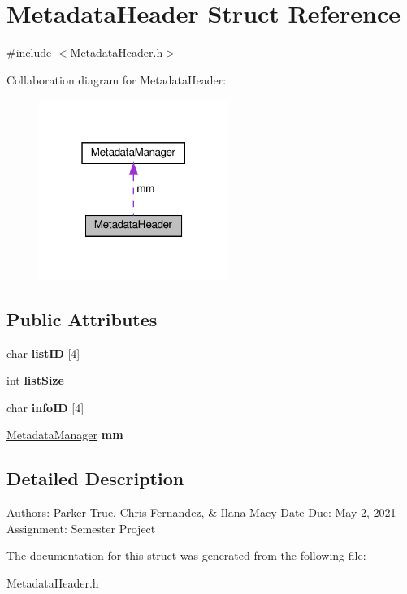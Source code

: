 \hypertarget{structMetadataHeader}{}\section{Metadata\+Header Struct Reference}
\label{structMetadataHeader}


{\ttfamily \#include $<$Metadata\+Header.\+h$>$}



Collaboration diagram for Metadata\+Header\+:
\nopagebreak
\begin{figure}[H]
\begin{center}
\leavevmode
\includegraphics[width=175pt]{dd/da8/structMetadataHeader__coll__graph}
\end{center}
\end{figure}
\subsection*{Public Attributes}
\begin{DoxyCompactItemize}
\item 
\mbox{\label{structMetadataHeader_ac337fc72c9ae30daa7e2e9df57cbf08c}} 
char {\bfseries list\+ID} \mbox{[}4\mbox{]}
\item 
\mbox{\label{structMetadataHeader_ad3bf1dfe7faecd43c79d3d9c81319e2b}} 
int {\bfseries list\+Size}
\item 
\mbox{\label{structMetadataHeader_aee40eba0102ce906a77af6ce2f344b44}} 
char {\bfseries info\+ID} \mbox{[}4\mbox{]}
\item 
\mbox{\label{structMetadataHeader_a4e9ac5e747d9d24bea5f0675fd243540}} 
\hyperlink{classMetadataManager}{Metadata\+Manager} {\bfseries mm}
\end{DoxyCompactItemize}


\subsection{Detailed Description}
Authors\+: Parker True, Chris Fernandez, \& Ilana Macy Date Due\+: May 2, 2021 Assignment\+: Semester Project 

The documentation for this struct was generated from the following file\+:\begin{DoxyCompactItemize}
\item 
Metadata\+Header.\+h\end{DoxyCompactItemize}
